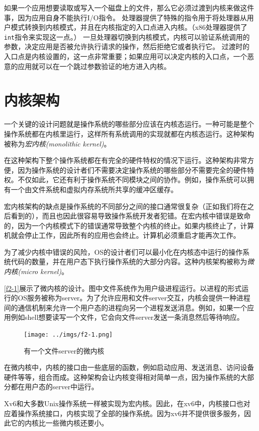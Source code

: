 如果一个应用想要读取或写入一个磁盘上的文件，那么它必须过渡到内核来做这件事，因为应用自身不能执行I/O指令。
处理器提供了特殊的指令用于将处理器从用户模式转换到内核模式，并且在内核指定的入口点进入内核。（x86处理器提供了\texttt{int}指令来实现这一点。）
一旦处理器切换到内核模式，内核可以验证系统调用的参数，决定应用是否被允许执行请求的操作，然后拒绝它或者执行它。
过渡时的入口点是内核设置的，这一点非常重要；如果应用可以决定内核的入口点，一个恶意的应用就可以在一个跳过参数验证的地方进入内核。

\section{内核架构}
一个关键的设计问题就是操作系统的哪些部分应该在内核态运行。一种可能是整个操作系统都在内核里运行，这样所有系统调用的实现就都在内核态运行。这种架构被称为\emph{宏内核(monolithic kernel)}。

在这种架构下整个操作系统都在有完全的硬件特权的情况下运行。这种架构非常方便，因为操作系统的设计者们不需要决定操作系统的哪些部分不需要完全的硬件特权。不仅如此，它还有利于操作系统不同模块之间的协作。例如，操作系统可以拥有一个由文件系统和虚拟内存系统所共享的缓冲区缓存。

宏内核架构的缺点是操作系统的不同部分之间的接口通常很复杂（正如我们将在之后看到的），而且也因此很容易导致操作系统开发者犯错。在宏内核中错误是致命的，因为一个内核模式下的错误通常导致整个内核的终止。如果内核终止了，计算机就会停止工作，因此所有的应用也会终止。计算机必须重启才能再次工作。

为了减少内核中错误的风险，OS的设计者们可以最小化在内核态中运行的操作系统代码的数量，并在用户态下执行操作系统的大部分内容。这种内核架构被称为\emph{微内核(micro kernel)}。

\autoref{f2-1}展示了微内核的设计。图中文件系统作为用户级进程运行。以进程的形式运行的OS服务被称为server。为了允许应用和文件server交互，内核会提供一种进程间的通信机制来允许一个用户态的进程向另一个进程发送消息。例如，如果一个应用例如shell想要读写一个文件，它会向文件server发送一条消息然后等待响应。

\begin{figure}[htbp]
    \centering
    \texttt{[image: ../imgs/f2-1.png]}
    \caption{有一个文件server的微内核}
    \label{f2-1}
\end{figure}

在微内核中，内核的接口由一些底层的函数，例如启动应用、发送消息、访问设备硬件等等，组合而成。这种架构会让内核变得相对简单一点，因为操作系统的大部分都在用户态的server中运行。

Xv6和大多数Unix操作系统一样被实现为宏内核。因此，在xv6中，内核接口也对应着操作系统接口，内核实现了全部的操作系统。因为xv6并不提供很多服务，因此它的内核比一些微内核还要小。

